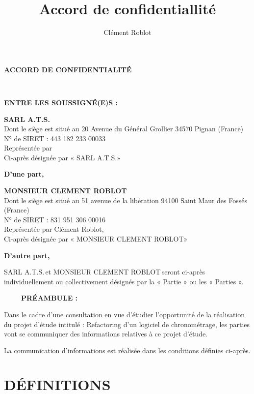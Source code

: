 \documentclass[]{karlito}
\title{Accord de confidentiallité}
\author{Clément Roblot}
\newcommand{\projectName}{Refactoring d'un logiciel de chronométrage}
\newcommand{\nameBeneficiaryCompanie}{MONSIEUR CLEMENT ROBLOT}
\newcommand{\nameBeneficiaryPerson}{Clément Roblot}
\newcommand{\addressBeneficiary}{51 avenue de la libération 94100 Saint Maur des Fossés (France)}
\newcommand{\siretBeneficiary}{831 951 306 00016}
\newcommand{\nameIssuingCompanie}{SARL A.T.S.}
\newcommand{\nameIssuingPerson}{}
\newcommand{\addressIssuing}{20 Avenue du Général Grollier 34570 Pignan (France)}
\newcommand{\siretIssuing}{443 182 233 00033}
\begin{document}
\begin{center}
\textbf{ACCORD DE CONFIDENTIALITÉ}
\end{center}

~\newline
~\newline

\textbf{ENTRE LES SOUSSIGNÉ(E)S :}
~\newline

\textbf{\nameIssuingCompanie}\\
Dont le siège est situé au \addressIssuing\\
N° de SIRET : \siretIssuing\\
Représentée par \nameIssuingPerson\\
Ci-après désignée par « \nameIssuingCompanie »

\begin{flushright}\textbf{D’une part,}\end{flushright}

\textbf{\nameBeneficiaryCompanie}\\
Dont le siège est situé au \addressBeneficiary\\
N° de SIRET : \siretBeneficiary\\
Représentée par \nameBeneficiaryPerson,\\
Ci-après désignée par « \nameBeneficiaryCompanie »

\begin{flushright}\textbf{D’autre part,}\end{flushright}


\nameIssuingCompanie\,et \nameBeneficiaryCompanie\,seront ci-après individuellement ou collectivement désignés par la « Partie » ou les « Parties ».

~\newline
~\newline
~\newline
\textbf{PRÉAMBULE :}
~\newline

Dans le cadre d’une consultation en vue d’étudier l’opportunité de la réalisation du projet d’étude intitulé : \projectName, les parties vont se communiquer des informations relatives à ce projet d’étude.

La communication d’informations est réalisée dans les conditions définies ci-après.



\newpage
\chapter{DÉFINITIONS}
\end{document}
